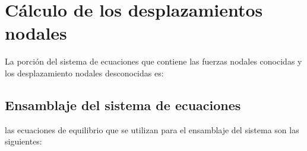 \documentclass[a4paper]{article}
\begin{document}
\medskip


\section{Cálculo de los desplazamientos nodales}
La porción del sistema de ecuaciones que contiene las fuerzas nodales conocidas y los desplazamiento nodales desconocidas es:
\\
\subsection{Ensamblaje del sistema de ecuaciones}
las ecuaciones de equilibrio que se utilizan para el ensamblaje del sistema son las siguientes:
\\
\\
\end{document}
